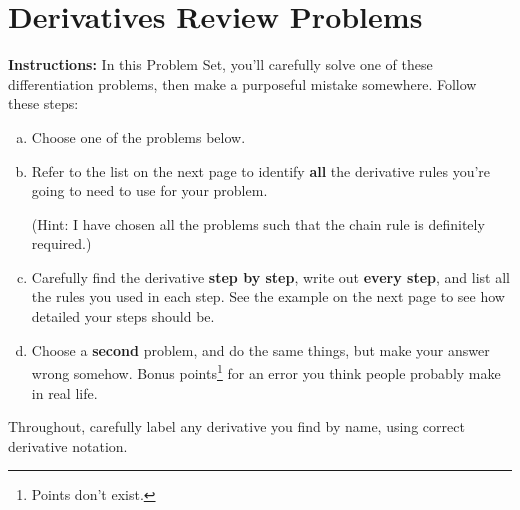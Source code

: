 

\newcommand{\diff}[1]{\frac{d}{d#1}}
\newcommand{\ddiff}[1]{\dfrac{d}{d#1}}
\renewcommand{\blue}[1]{\textcolor{blue}{\boxed{#1}}}

\section{Derivatives Review Problems}

\textbf{Instructions:} 
In this Problem Set, you'll carefully solve one of these differentiation problems, then make a purposeful mistake somewhere. Follow these steps:
\begin{enumerate}[(a)]
	\item Choose one of the problems below.
	\item Refer to the list on the next page to identify \textbf{all} the derivative rules you're going to need to use for your problem.
	
	(Hint: I have chosen all the problems such that the chain rule is definitely required.)
	\item Carefully find the derivative \textbf{step by step}, write out \textbf{every step}, and list all the rules you used in each step. See the example on the next page to see how detailed your steps should be.
	\item Choose a \textbf{second} problem, and do the same things, but make your answer wrong somehow. Bonus points\footnote{Points don't exist.} for an error you think people probably make in real life.
\end{enumerate}
Throughout, carefully label any derivative you find by name, using correct derivative notation.
\vfill
\hrulefill

